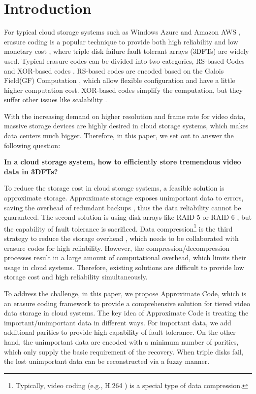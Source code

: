 \documentclass[sigconf]{acmart}
\begin{document}
\thispagestyle{fancy} 
\pagestyle{fancy}
\cfoot{\thepage}

\section{Introduction}
For typical cloud storage systems such as Windows Azure \cite{calder2011windows} and Amazon AWS \cite{bermudez2013exploring}, erasure coding is a popular technique to provide both high reliability and low monetary cost \cite{EVENODD, RDP, BlaumRoth, XCode, CRS, TripleStar, TPtech, RSL}, where triple disk failure fault tolerant arrays (3DFTs) are widely used. Typical erasure codes can be divided into two categories, RS-based Codes \cite{RS} \cite{LRC} and XOR-based codes \cite{EVENODD, hcode, STAR, TIP}. RS-based codes are encoded based on the Galois Field(GF) Computation \cite{RS}, which allow flexible configuration and have a little higher computation cost. XOR-based codes simplify the computation, but they suffer other issues like scalability \cite{wu2012sdm, jiang2016bdr}.

With the increasing demand on higher resolution and frame rate for video data, massive storage devices are highly desired in cloud storage systems, which makes data centers much bigger.
Therefore, in this paper, we set out to answer the following question:

\textbf{In a cloud storage system, how to efficiently store tremendous video data in 3DFTs?}

To reduce the storage cost in cloud storage systems, a feasible solution is approximate storage. Approximate storage exposes unimportant data to errors, saving the overhead of redundant backups \cite{niklaus2018context, sampson2014approximate} , thus the data reliability cannot be guaranteed.
The second solution is using disk arrays like RAID-5 or RAID-6 \cite{RAID}, but the capability of fault tolerance is sacrificed.
Data compression\footnote{Typically, video coding (e.g., H.264 \cite{wiegand2003overview}) is a special type of data compression.}
is the third strategy to reduce the storage overhead \cite{ziv1977universal, ziv1978compression, deutsch1996deflate}, which needs to be collaborated with erasure codes for high reliability. However, the compression/decompression processes result in a large amount of computational overhead, which limits their usage in cloud systems. 
Therefore, existing solutions are difficult to provide low storage cost and high reliability simultaneously.

To address the challenge, in this paper, we propose Approximate Code, which is an erasure coding framework to provide a comprehensive solution for tiered video data storage in cloud systems. The key idea of Approximate Code is treating the important/unimportant data in different ways. For important data, we add additional parities to provide high capability of fault tolerance. On the other hand, the unimportant data are encoded with a minimum number of parities, which only supply the basic requirement of the recovery. When triple disks fail, the lost unimportant data can be reconstructed via a fuzzy manner.
\end{document}

